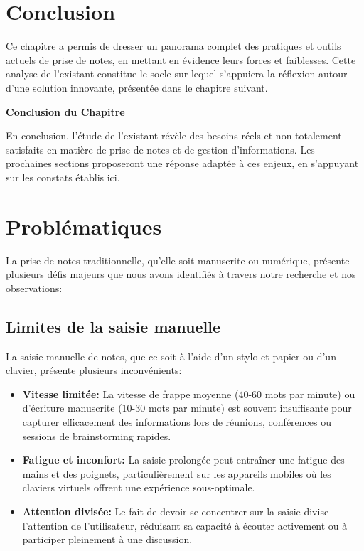 \section{Conclusion}

Ce chapitre a permis de dresser un panorama complet des pratiques et outils actuels de prise de notes, en mettant en évidence leurs forces et faiblesses. Cette analyse de l’existant constitue le socle sur lequel s’appuiera la réflexion autour d’une solution innovante, présentée dans le chapitre suivant.

\vspace{1cm}
\begin{center}
\textbf{\large Conclusion du Chapitre}
\end{center}

\noindent
En conclusion, l’étude de l’existant révèle des besoins réels et non totalement satisfaits en matière de prise de notes et de gestion d’informations. Les prochaines sections proposeront une réponse adaptée à ces enjeux, en s’appuyant sur les constats établis ici.
\section{Problématiques}

La prise de notes traditionnelle, qu'elle soit manuscrite ou numérique, présente plusieurs défis majeurs que nous avons identifiés à travers notre recherche et nos observations:

\subsection{Limites de la saisie manuelle}

La saisie manuelle de notes, que ce soit à l'aide d'un stylo et papier ou d'un clavier, présente plusieurs inconvénients:

\begin{itemize}
    \item \textbf{Vitesse limitée:} La vitesse de frappe moyenne (40-60 mots par minute) ou d'écriture manuscrite (10-30 mots par minute) est souvent insuffisante pour capturer efficacement des informations lors de réunions, conférences ou sessions de brainstorming rapides.
    
    \item \textbf{Fatigue et inconfort:} La saisie prolongée peut entraîner une fatigue des mains et des poignets, particulièrement sur les appareils mobiles où les claviers virtuels offrent une expérience sous-optimale.
    
    \item \textbf{Attention divisée:} Le fait de devoir se concentrer sur la saisie divise l'attention de l'utilisateur, réduisant sa capacité à écouter activement ou à participer pleinement à une discussion.
\end{itemize}


